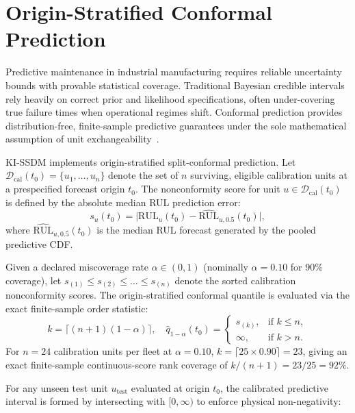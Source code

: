 \documentclass[a4paper,fleqn]{cas-dc}
\newcommand{\RUL}{\mathrm{RUL}}
\begin{document}
\section{Origin-Stratified Conformal Prediction}
\label{sec:conformal_uq}

Predictive maintenance in industrial manufacturing requires reliable uncertainty bounds with provable statistical coverage. Traditional Bayesian credible intervals rely heavily on correct prior and likelihood specifications, often under-covering true failure times when operational regimes shift. Conformal prediction provides distribution-free, finite-sample predictive guarantees under the sole mathematical assumption of unit exchangeability~\cite{Angelopoulos_2023, Zhang_CP_2025}.

KI-SSDM implements origin-stratified split-conformal prediction. Let $\mathcal{D}_{\mathrm{cal}}(t_0) = \{u_1, \dots, u_n\}$ denote the set of $n$ surviving, eligible calibration units at a prespecified forecast origin $t_0$. The nonconformity score for unit $u \in \mathcal{D}_{\mathrm{cal}}(t_0)$ is defined by the absolute median RUL prediction error:
\begin{equation}
    s_u(t_0) = \bigl|\RUL_u(t_0) - \widehat{\RUL}_{u,0.5}(t_0)\bigr|,
    \label{eq:nonconformity_score}
\end{equation}
where $\widehat{\RUL}_{u,0.5}(t_0)$ is the median RUL forecast generated by the pooled predictive CDF.

Given a declared miscoverage rate $\alpha \in (0, 1)$ (nominally $\alpha = 0.10$ for 90\% coverage), let $s_{(1)} \le s_{(2)} \le \dots \le s_{(n)}$ denote the sorted calibration nonconformity scores. The origin-stratified conformal quantile is evaluated via the exact finite-sample order statistic:
\begin{equation}
    k = \lceil (n + 1)(1 - \alpha) \rceil, \quad \hat{q}_{1-\alpha}(t_0) = \begin{cases} s_{(k)}, & \text{if } k \le n, \\ \infty, & \text{if } k > n. \end{cases}
    \label{eq:conformal_quantile}
\end{equation}
For $n = 24$ calibration units per fleet at $\alpha = 0.10$, $k = \lceil 25 \times 0.90 \rceil = 23$, giving an exact finite-sample continuous-score rank coverage of $k / (n + 1) = 23 / 25 = 92\%$.

For any unseen test unit $u_{\mathrm{test}}$ evaluated at origin $t_0$, the calibrated predictive interval is formed by intersecting with $[0, \infty)$ to enforce physical non-negativity:
\end{document}
